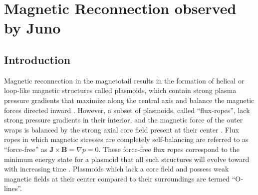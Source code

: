 \chapter{Magnetic Reconnection observed by Juno}



\section{Introduction}
Magnetic reconnection in the magnetotail results in the formation of helical or loop‐like magnetic structures called plasmoids, which contain strong plasma pressure gradients that maximize along the central axis and balance the magnetic forces directed inward \cite{Hones1984StructureActivity, Kivelson1995ModelsPlasmas, Slavin1989CDAWAssessment}. However, a subset of plasmoids, called ``flux‐ropes'', lack strong pressure gradients in their interior, and the magnetic force of the outer wraps is balanced by the strong axial core field present at their center \cite{Moldwin1991PlasmoidsRopes,Sibeck1984MagnetotailRopes}. Flux ropes in which magnetic stresses are completely self‐balancing are referred to as “force‐free” as $\mathbf{J}\times\mathbf{B}=\nabla p = 0$. These force‐free flux ropes correspond to the minimum energy state for a plasmoid that all such structures will evolve toward with increasing time \cite{Priest2013TheLecture,Taylor1974RelaxationFields}. Plasmoids which lack a core field and possess weak magnetic fields at their center compared to their surroundings are termed ``O‐lines''.

